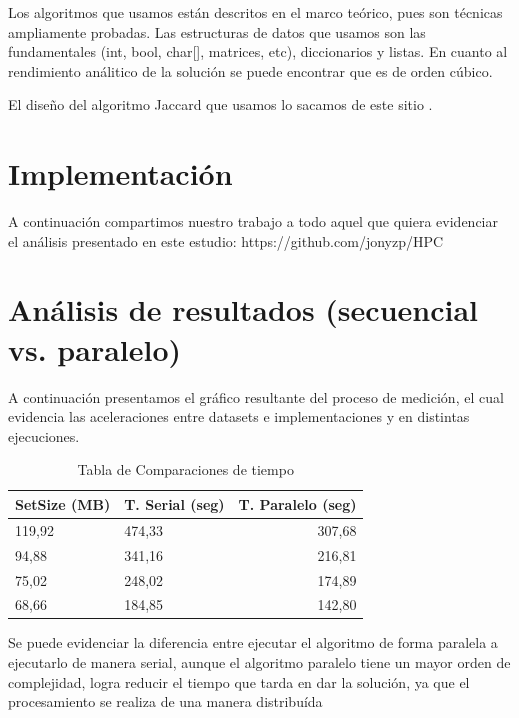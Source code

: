 \documentclass[fleqn,10pt]{SelfArx} %
\begin{document}
Los algoritmos que usamos están descritos en el marco teórico, pues son técnicas ampliamente probadas.
Las estructuras de datos que usamos son las fundamentales (int, bool, char[], matrices, etc), diccionarios y listas.
En cuanto al rendimiento análitico de la solución se puede encontrar que es de orden cúbico.

El diseño del algoritmo Jaccard que usamos lo sacamos de este sitio \cite{jaccard_seudo}. 

\section{Implementación}

A continuación compartimos nuestro trabajo a todo aquel que quiera evidenciar el análisis presentado en este estudio: https://github.com/jonyzp/HPC

\section{Análisis de resultados (secuencial vs. paralelo)}

A continuación presentamos el gráfico resultante del proceso de medición, el cual evidencia las aceleraciones entre datasets e implementaciones y en distintas ejecuciones.

\begin{table}[hbt]
	\caption{Tabla de Comparaciones de tiempo}
	\centering
	\begin{tabular}{llr}
		\cmidrule(r){1-3}
		SetSize (MB) & T. Serial (seg) & T. Paralelo (seg)\\
		\midrule
		
		119,92 & 474,33 & 307,68 \\
		
		94,88 & 341,16 & 216,81 \\
		
		75,02 & 248,02 & 174,89 \\
		
		68,66 & 184,85 & 142,80 \\
		
		\bottomrule
	\end{tabular}
	\label{tab:label}
\end{table}


Se puede evidenciar la diferencia entre ejecutar el algoritmo de forma paralela a ejecutarlo de manera serial, aunque el algoritmo paralelo tiene un mayor orden de complejidad, logra reducir el tiempo que tarda en dar la solución, ya que el procesamiento se realiza de una manera distribuída
\end{document}
